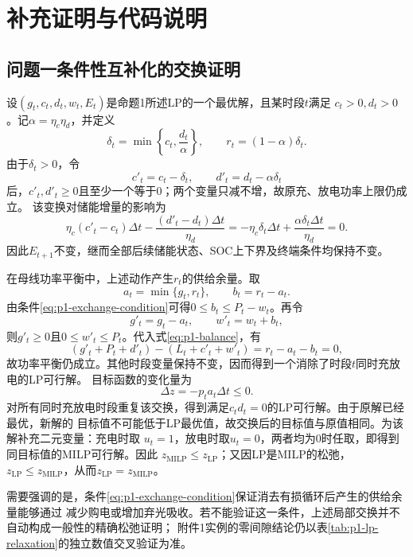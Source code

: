 \section{补充证明与代码说明}

\subsection{问题一条件性互补化的交换证明}
\label{app:p1-relaxation-proof}
\begingroup\small
设$(g_t,c_t,d_t,w_t,E_t)$是命题1所述LP的一个最优解，且某时段$t$满足
$c_t>0,d_t>0$。记$\alpha=\eta_c\eta_d$，并定义
\[
 \delta_t=\min\left\{c_t,\frac{d_t}{\alpha}\right\},\qquad
 r_t=(1-\alpha)\delta_t.
\]
由于$\delta_t>0$，令
\[
 c'_t=c_t-\delta_t,\qquad d'_t=d_t-\alpha\delta_t
\]
后，$c'_t,d'_t\ge0$且至少一个等于0；两个变量只减不增，故原充、放电功率上限仍成立。
该变换对储能增量的影响为
\[
 \eta_c(c'_t-c_t)\Delta t-
 \frac{(d'_t-d_t)\Delta t}{\eta_d}
 =-\eta_c\delta_t\Delta t+
 \frac{\alpha\delta_t\Delta t}{\eta_d}=0.
\]
因此$E_{t+1}$不变，继而全部后续储能状态、SOC上下界及终端条件均保持不变。

在母线功率平衡中，上述动作产生$r_t$的供给余量。取
\[
 a_t=\min\{g_t,r_t\},\qquad b_t=r_t-a_t.
\]
由条件\eqref{eq:p1-exchange-condition}可得$0\le b_t\le P_t-w_t$。再令
\[
 g'_t=g_t-a_t,\qquad w'_t=w_t+b_t,
\]
则$g'_t\ge0$且$0\le w'_t\le P_t$。代入式\eqref{eq:p1-balance}，有
\[
 (g'_t+P_t+d'_t)-(L_t+c'_t+w'_t)
 =r_t-a_t-b_t=0,
\]
故功率平衡仍成立。其他时段变量保持不变，因而得到一个消除了时段$t$同时充放电的LP可行解。
目标函数的变化量为
\[
 \Delta z=-p_ta_t\Delta t\le0.
\]
对所有同时充放电时段重复该交换，得到满足$c_td_t=0$的LP可行解。由于原解已经最优，新解的
目标值不可能低于LP最优值，故交换后的目标值与原值相同。为该解补充二元变量：充电时取
$u_t=1$，放电时取$u_t=0$，两者均为0时任取，即得到同目标值的MILP可行解。因此
$z_{\mathrm{MILP}}\le z_{\mathrm{LP}}$；又因LP是MILP的松弛，
$z_{\mathrm{LP}}\le z_{\mathrm{MILP}}$，从而$z_{\mathrm{LP}}=z_{\mathrm{MILP}}$。

需要强调的是，条件\eqref{eq:p1-exchange-condition}保证消去有损循环后产生的供给余量能够通过
减少购电或增加弃光吸收。若不能验证这一条件，上述局部交换并不自动构成一般性的精确松弛证明；
附件1实例的零间隙结论仍以表\ref{tab:p1-lp-relaxation}的独立数值交叉验证为准。
\endgroup



